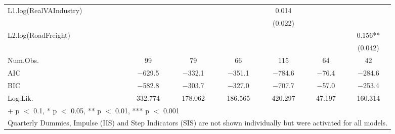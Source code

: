 \begin{table}
{\begin{tabular}[t]{lcccccc}
L1.log(RealVAIndustry) &  &  &  & \num{0.014} &  & \\
 &  &  &  & (\num{0.022}) &  & \\
L2.log(RoadFreight) &  &  &  &  &  & \num{0.156}**\\
 &  &  &  &  &  & (\num{0.042})\\
\midrule
Num.Obs. & \num{99} & \num{79} & \num{66} & \num{115} & \num{64} & \num{42}\\
AIC & \num{-629.5} & \num{-332.1} & \num{-351.1} & \num{-784.6} & \num{-76.4} & \num{-284.6}\\
BIC & \num{-582.8} & \num{-303.7} & \num{-327.0} & \num{-707.7} & \num{-57.0} & \num{-253.4}\\
Log.Lik. & \num{332.774} & \num{178.062} & \num{186.565} & \num{420.297} & \num{47.197} & \num{160.314}\\
\bottomrule
\multicolumn{7}{l}{\rule{0pt}{1em}+ p $<$ 0.1, * p $<$ 0.05, ** p $<$ 0.01, *** p $<$ 0.001}\\
\multicolumn{7}{l}{\rule{0pt}{1em}Quarterly Dummies, Impulse (IIS) and Step Indicators (SIS) are not shown individually but were activated for all models.}\\
\end{tabular}}
\end{table}

